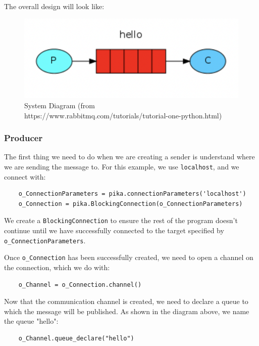 \documentclass{article}
\begin{document}
The overall design will look like: 

\begin{figure}[H]
    \centering
    \includegraphics[scale=0.8]{RabbitMQ/images/t1-1.png}
    \caption{System Diagram (from https://www.rabbitmq.com/tutorials/tutorial-one-python.html)}
    \label{t1-1}
\end{figure}

\subsubsection{Producer}

The first thing we need to do when we are creating a sender is understand where we are sending the message to. For this example, we use \verb|localhost|, and we connect with:

\begin{verbatim}
    o_ConnectionParameters = pika.connectionParameters('localhost')
    o_Connection = pika.BlockingConnection(o_ConnectionParameters)
\end{verbatim}

We create a \verb|BlockingConnection| to ensure the rest of the program doesn't continue until we have successfully connected to the target specified by \verb|o_ConnectionParameters|.

Once \verb|o_Connection| has been successfully created, we need to open a channel on the connection, which we do with:

\begin{verbatim}
    o_Channel = o_Connection.channel()
\end{verbatim}

Now that the communication channel is created, we need to declare a queue to which the message will be published. As shown in the diagram above, we name the queue "hello":

\begin{verbatim}
    o_Channel.queue_declare("hello")
\end{verbatim}
\end{document}
